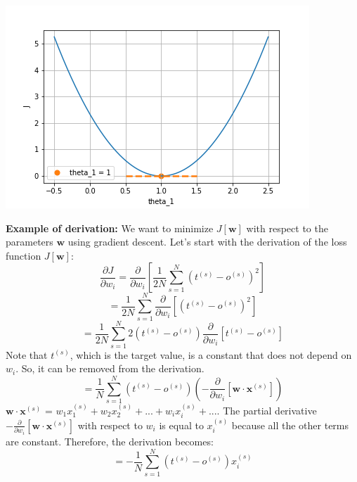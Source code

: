 \begin{center}
    \includegraphics[scale=0.5]{images/partial derivative_2.png}
\end{center}
\textbf{Example of derivation:}\newline\newline
We want to minimize $J[\textbf{w}]$ with respect to the parameters $\textbf{w}$ using gradient descent. Let's start with the derivation of the loss function $J[\textbf{w}]$:
\[\frac{\partial J}{\partial w_{i}} = \frac{\partial}{\partial w_{i}}\left[\frac{1}{2N}\sum_{s=1}^{N}(t^{(s)} - o^{(s)})^{2} \right]\]
\[= \frac{1}{2N} \sum_{s=1}^{N}\frac{\partial}{\partial w_{i}}\left[ (t^{(s)} - o^{(s)})^{2} \right]\]
\[= \frac{1}{2N}\sum_{s=1}^{N}2(t^{(s)} - o^{(s)})\frac{\partial}{\partial w_{i}}\left[ t^{(s)} - o^{(s)}\right]\]
Note that $t^{(s)}$, which is the target value, is a constant that does not depend on $w_{i}$. So, it can be removed from the derivation.
\[= \frac{1}{N} \sum_{s=1}^{N}(t^{(s)} - o^{(s)})\left(-\frac{\partial}{\partial w_{i}}\left[\textbf{w} \cdot \textbf{x}^{(s)}\right]\right)\]
$\textbf{w} \cdot \textbf{x}^{(s)}$ = $w_{1}x_{1}^{(s)} + w_{2}x_{2}^{(s)} + ... + w_{i}x_{i}^{(s)} + ...$. The partial derivative $-\frac{\partial}{\partial w_{i}}\left[\textbf{w} \cdot \textbf{x}^{(s)}\right]$ with respect to  $w_{i}$ is equal to $x_{i}^{(s)}$ because all the other terms are constant. Therefore, the derivation becomes:
\[ = -\frac{1}{N}\sum_{s=1}^{N}(t^{(s)} - o^{(s)})x_{i}^{(s)}\]
